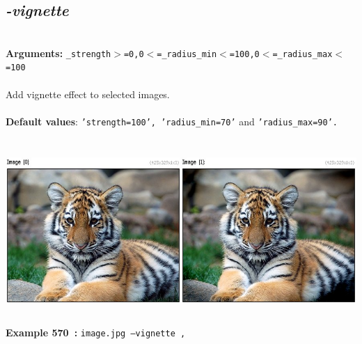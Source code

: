\documentclass[a4paper,11pt,twoside]{book}
\begin{document}
\subsection{\emph{-vignette} }\vspace*{-0.5em}
~\\\textbf{Arguments: } 
{\small \texttt{\_strength$>$=0,0$<$=\_radius\_min$<$=100,0$<$=\_radius\_max$<$=100}}\\~\\
Add vignette effect to selected images.
~\\~\\\textbf{Default values}: {\small \texttt{'strength=100', 'radius\_min=70'} and \texttt{'radius\_max=90'.}}
\begin{center}\includegraphics[keepaspectratio=true,height=7cm,width=\textwidth]{img/gmic_def570.jpg}\\
{\footnotesize \textbf{Example 570~:} \texttt{image.jpg --vignette ,}}
\end{center}
\end{document}
